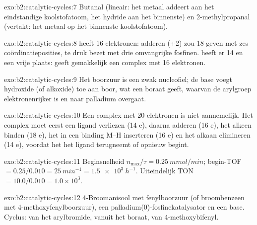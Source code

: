 \begin{solution}{exo:b2:catalytic-cycles:7}
Butanal  (lineair: het metaal addeert aan het eindstandige koolstofatoom, het hydride aan
het binnenste) en 2-methylpropanal  (vertakt: het metaal op het binnenste
koolstofatoom).
\end{solution}

\begin{solution}{exo:b2:catalytic-cycles:8}
 heeft 16 elektronen:  adderen (+2) zou 18 geven met zes
coördinatieposities, te druk bezet met drie omvangrijke fosfinen.  heeft er 14
en een vrije plaats:  geeft gemakkelijk een complex met 16 elektronen.
\end{solution}

\begin{solution}{exo:b2:catalytic-cycles:9}
Het boorzuur is een zwak nucleofiel; de base voegt hydroxide (of alkoxide) toe aan boor,
wat een boraat  geeft, waarvan de arylgroep elektronenrijker is en naar
palladium overgaat.
\end{solution}

\begin{solution}{exo:b2:catalytic-cycles:10}
Een complex met 20 elektronen is niet aannemelijk. Het complex moet eerst een ligand verliezen (14 e), daarna
 adderen (16 e), het alkeen binden (18 e), het in een binding M--H inserteren (16 e) en het
alkaan elimineren (14 e), voordat het het ligand terugneemt of opnieuw begint.
\end{solution}

\begin{solution}{exo:b2:catalytic-cycles:11}
Beginsnelheid $n_{\max}/\tau = \qty{0.25}{mmol/min}$; begin-TOF $= 0.25/0.010 =
\qty{25}{min^{-1}} = \qty{1.5e3}{h^{-1}}$. Uiteindelijk TON $= 10.0/0.010 = 1.0 \times 10^3$.
\end{solution}

\begin{solution}{exo:b2:catalytic-cycles:12}
4-Broomanisool met fenylboorzuur (of broombenzeen met 4-methoxyfenylboorzuur),
een palladium(0)-fosfinekatalysator en een base. Cyclus:  van het
arylbromide,  vanuit het boraat,  van
4-methoxybifenyl.
\end{solution}

